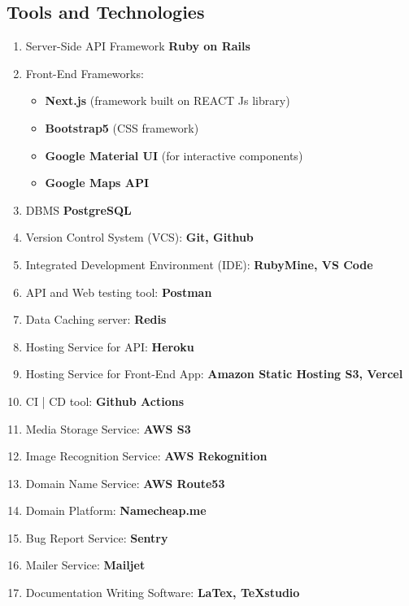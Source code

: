 \subsection{Tools and Technologies}
\begin{enumerate}
	\item Server-Side API Framework \textbf{Ruby on Rails} \citep{rails-guides}
	\item Front-End Frameworks:
	\begin{itemize}
		\item \textbf{Next.js} (framework built on REACT Js library) \citep{nextjs-docs}
		\item \textbf{Bootstrap5} (CSS framework) \citep{bootstrap-reactjs}
		\item \textbf{Google Material UI} (for interactive components) \citep{material-ui-docs}
		\item \textbf{Google Maps API \citep{google-maps-docs}}
	\end{itemize}
	\item DBMS \textbf{PostgreSQL} \citep{postgresql-docs}
	\item Version Control System (VCS): \textbf{Git, Github} \citep{git-docs}
	\item Integrated Development Environment (IDE): \textbf{RubyMine, VS Code}
	\item API and Web testing tool: \textbf{Postman} \citep{postman-docs}
	\item Data Caching server: \textbf{Redis}
	\item Hosting Service for API: \textbf{Heroku} \citep{heroku-docs}
	\item Hosting Service for Front-End App: \textbf{Amazon Static Hosting S3, Vercel}
	\item CI | CD tool: \textbf{Github Actions}  \citep{git-workflows}
	\item Media Storage Service: \textbf{AWS S3} \citep{aws-s3-storage}
	\item Image Recognition Service: \textbf{AWS Rekognition \citep{aws-rekognition}}
	\item Domain Name Service: \textbf{AWS Route53}
	\item Domain Platform: \textbf{Namecheap.me}
	\item Bug Report Service: \textbf{Sentry} \citep{sentry-docs}
	\item Mailer Service: \textbf{Mailjet}
	\item Documentation Writing Software: \textbf{LaTex, TeXstudio} \citep{mittelbach2004latex}
\end{enumerate}

